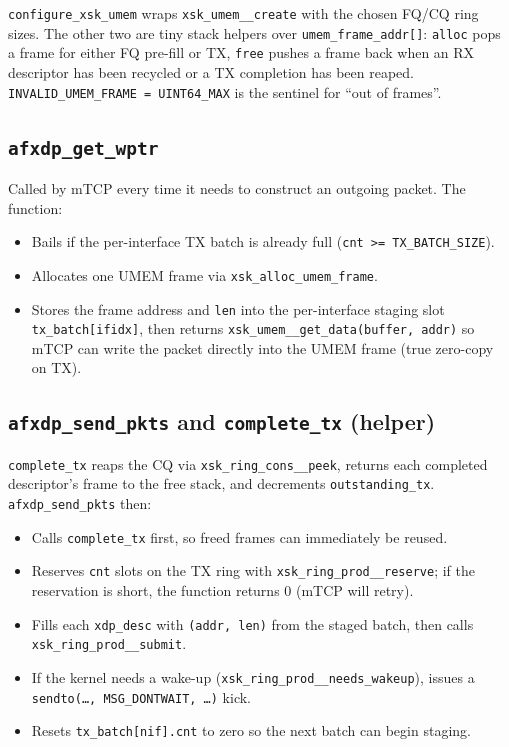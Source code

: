 \documentclass[10pt, letterpaper, twocolumn]{article}
\begin{document}
\texttt{configure\_xsk\_umem} wraps \texttt{xsk\_umem\_\_create} with the chosen FQ/CQ ring sizes. The other two are tiny stack helpers over \texttt{umem\_frame\_addr[]}: \texttt{alloc} pops a frame for either FQ pre-fill or TX, \texttt{free} pushes a frame back when an RX descriptor has been recycled or a TX completion has been reaped. \texttt{INVALID\_UMEM\_FRAME = UINT64\_MAX} is the sentinel for ``out of frames''.

\subsection{\texttt{afxdp\_get\_wptr}}

Called by mTCP every time it needs to construct an outgoing packet. The function:
\begin{itemize}
    \item Bails if the per-interface TX batch is already full (\texttt{cnt >= TX\_BATCH\_SIZE}).
    \item Allocates one UMEM frame via \texttt{xsk\_alloc\_umem\_frame}.
    \item Stores the frame address and \texttt{len} into the per-interface staging slot \texttt{tx\_batch[ifidx]}, then returns \texttt{xsk\_umem\_\_get\_data(buffer, addr)} so mTCP can write the packet directly into the UMEM frame (true zero-copy on TX).
\end{itemize}

\subsection{\texttt{afxdp\_send\_pkts} and \texttt{complete\_tx} (helper)}

\texttt{complete\_tx} reaps the CQ via \texttt{xsk\_ring\_cons\_\_peek}, returns each completed descriptor's frame to the free stack, and decrements \texttt{outstanding\_tx}. \texttt{afxdp\_send\_pkts} then:
\begin{itemize}
    \item Calls \texttt{complete\_tx} first, so freed frames can immediately be reused.
    \item Reserves \texttt{cnt} slots on the TX ring with \texttt{xsk\_ring\_prod\_\_reserve}; if the reservation is short, the function returns 0 (mTCP will retry).
    \item Fills each \texttt{xdp\_desc} with \texttt{(addr, len)} from the staged batch, then calls \texttt{xsk\_ring\_prod\_\_submit}.
    \item If the kernel needs a wake-up (\texttt{xsk\_ring\_prod\_\_needs\_wakeup}), issues a \texttt{sendto(\dots, MSG\_DONTWAIT, \dots)} kick.
    \item Resets \texttt{tx\_batch[nif].cnt} to zero so the next batch can begin staging.
\end{itemize}
\end{document}
